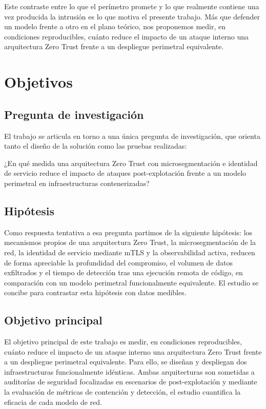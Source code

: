 \documentclass[11pt,spanish,listoffigures,listoftables]{tfgetsinf}
\begin{document}
    Este contraste entre lo que el perímetro promete y lo que realmente contiene una vez producida la intrusión es lo que motiva el presente trabajo. Más que defender un modelo frente a otro en el plano teórico, nos proponemos medir, en condiciones reproducibles, cuánto reduce el impacto de un ataque interno una arquitectura Zero Trust frente a un despliegue perimetral equivalente.
    
    \section{Objetivos}
        \subsection{Pregunta de investigación}
        El trabajo se articula en torno a una única pregunta de investigación, que orienta tanto el diseño de la solución como las pruebas realizadas:

        ¿En qué medida una arquitectura Zero Trust con microsegmentación e identidad de servicio reduce el impacto de ataques post-explotación frente a un modelo perimetral en infraestructuras contenerizadas?

        \subsection{Hipótesis}
        Como respuesta tentativa a esa pregunta partimos de la siguiente hipótesis: los mecanismos propios de una arquitectura Zero Trust, la microsegmentación de la red, la identidad de servicio mediante mTLS y la observabilidad activa, reducen de forma apreciable la profundidad del compromiso, el volumen de datos exfiltrados y el tiempo de detección tras una ejecución remota de código, en comparación con un modelo perimetral funcionalmente equivalente. El estudio se concibe para contrastar esta hipótesis con datos medibles.

        \subsection{Objetivo principal}
        El objetivo principal de este trabajo es medir, en condiciones reproducibles, cuánto reduce el impacto de un ataque interno una arquitectura Zero Trust frente a un despliegue perimetral equivalente. Para ello, se diseñan y despliegan dos infraestructuras funcionalmente idénticas. Ambas arquitecturas son sometidas a auditorías de seguridad focalizadas en escenarios de post-explotación y mediante la evaluación de métricas de contención y detección, el estudio cuantifica la eficacia de cada modelo de red.
\end{document}
